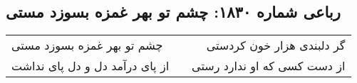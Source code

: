 \begin{center}
\section*{رباعی شماره ۱۸۳۰: چشم تو بهر غمزه بسوزد مستی}
\label{sec:1830}
\begin{longtable}{l p{0.5cm} r}
چشم تو بهر غمزه بسوزد مستی
&&
گر دلبندی هزار خون کردستی
\\
از پای درآمد دل و دل پای نداشت
&&
از دست کسی که او ندارد رستی
\\
\end{longtable}
\end{center}

